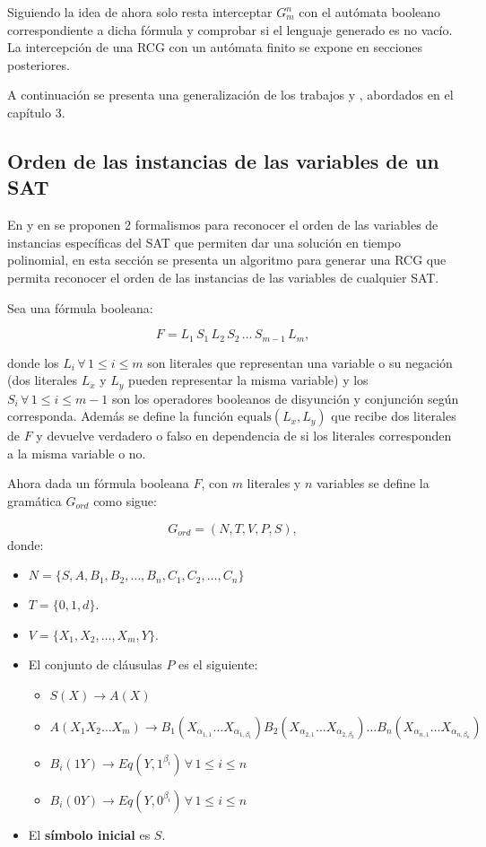 \documentclass[12pt]{article}
\begin{document}
Siguiendo la idea de \cite{aSMSAT} ahora solo resta interceptar $G^n_m$ con el autómata booleano correspondiente a dicha
fórmula y comprobar si el lenguaje generado es no vacío. La intercepción de una RCG con un autómata finito se expone en secciones posteriores.

A continuación se presenta una generalización de los trabajos \cite{aCFSAT} y \cite{aSRCSAT}, abordados en el capítulo 3.

\subsection{Orden de las instancias de las variables de un SAT}

En \cite{aCFSAT} y en \cite{aSRCSAT} se proponen 2 formalismos para reconocer el orden de las variables de instancias específicas
del SAT que permiten dar una solución en tiempo polinomial, en esta sección se presenta un algoritmo para generar una
RCG que permita reconocer el orden de las instancias de las variables de cualquier SAT.

Sea una fórmula booleana:

$$F=L_1\,S_1\,L_2\,S_2\,\ldots\,S_{m-1}\,L_m,$$

donde los $L_i\,\forall\,1\leq i\leq m$ son literales que representan una variable o su negación (dos literales
$L_x$ y $L_y$ pueden representar la misma variable) y los $S_i\,\forall\,1\leq i\leq m-1$ son los operadores
booleanos de disyunción y conjunción según corresponda. Además se define la función $\text{equals}(L_x,L_y)$
que recibe dos literales de $F$ y devuelve verdadero o falso en dependencia de si los literales corresponden
a la misma variable o no.

Ahora dada un fórmula booleana $F$, con $m$ literales y $n$ variables se define la gramática $G_{ord}$
como sigue:

\[
    G_{ord} = (N, T, V, P, S),
\]
donde:

\begin{itemize}
    \item $N=\{S,A,B_1,B_2,\ldots,B_n,C_1,C_2,\ldots,C_n\}$
    \item $T=\{0,1,d\}$.
    \item $V=\{X_1,X_2,\ldots,X_m,Y\}$.
    \item El conjunto de cláusulas $P$ es el siguiente:
          \begin{itemize}
              \item  $S(X)\to A(X)$
              \item $A(X_1X_2\ldots X_m)\to
                        B_1(X_{\alpha_{1,1}}\ldots X_{\alpha_{1,\beta_1}})
                        B_2(X_{\alpha_{2,1}}\ldots X_{\alpha_{2,\beta_2}})
                        \ldots B_n(X_{\alpha_{n,1}}\ldots X_{\alpha_{n,\beta_n}})$
              \item $B_i(1Y)\to  Eq(Y,1^{\beta_i})\,\forall \,1\leq i\leq n$

              \item $B_i(0Y)\to  Eq(Y,0^{\beta_i})\,\forall \,1\leq i\leq n$
          \end{itemize}
    \item El \textbf{símbolo inicial} es $S$.
\end{itemize}
\end{document}
